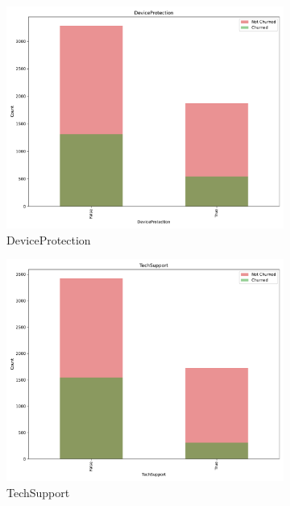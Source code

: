 \documentclass[a4paper,11pt]{article}
\begin{document}
\begin{landscape}
\begin{figure}
\begin{subfigure}{0.14\linewidth}
        \includegraphics[width=\linewidth]{figures/understanding/DeviceProtection.pdf}
        \caption{DeviceProtection}
    \end{subfigure}
    \begin{subfigure}{0.14\linewidth}
        \includegraphics[width=\linewidth]{figures/understanding/TechSupport.pdf}
        \caption{TechSupport}
    \end{subfigure}
    \begin{subfigure}{0.14\linewidth}

\end{subfigure}
\end{figure}
\end{landscape}
\end{document}
